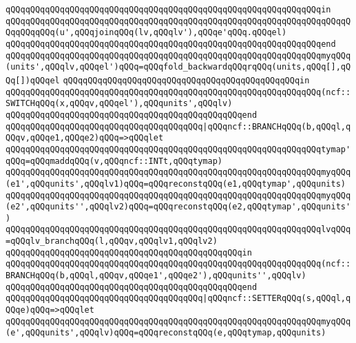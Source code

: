 \verb|qQQqqQQqqQQqqQQqqQQqqQQqqQQqqQQqqQQqqQQqqQQqqQQqqQQqqQQqqQQqqQQqin|\newline
\verb|qQQqqQQqqQQqqQQqqQQqqQQqqQQqqQQqqQQqqQQqqQQqqQQqqQQqqQQqqQQqqQQqqQQqqQQqqQQqqQQq(u',qQQqjoinqQQq(lv,qQQqlv'),qQQqe'qQQq.qQQqel)|\newline
\verb|qQQqqQQqqQQqqQQqqQQqqQQqqQQqqQQqqQQqqQQqqQQqqQQqqQQqqQQqqQQqqQQqend|\newline
\verb|qQQqqQQqqQQqqQQqqQQqqQQqqQQqqQQqqQQqqQQqqQQqqQQqqQQqqQQqqQQqqQQqmyqQQq(units',qQQqlv,qQQqel')qQQq=qQQqfold_backwardqQQqrqQQq(units,qQQq[],qQQq[])qQQqel|\newline
\verb|qQQqqQQqqQQqqQQqqQQqqQQqqQQqqQQqqQQqqQQqqQQqqQQqin|\newline
\verb|qQQqqQQqqQQqqQQqqQQqqQQqqQQqqQQqqQQqqQQqqQQqqQQqqQQqqQQqqQQqqQQq(ncf::SWITCHqQQq(x,qQQqv,qQQqel'),qQQqunits',qQQqlv)|\newline
\verb|qQQqqQQqqQQqqQQqqQQqqQQqqQQqqQQqqQQqqQQqqQQqqQQqend|\newline
\verb|qQQqqQQqqQQqqQQqqQQqqQQqqQQqqQQqqQQqqQQq|\verb#|qQQqncf::BRANCHqQQq(b,qQQql,qQQqv,qQQqe1,qQQqe2)qQQq=>qQQqlet#\newline
\verb|qQQqqQQqqQQqqQQqqQQqqQQqqQQqqQQqqQQqqQQqqQQqqQQqqQQqqQQqqQQqqQQqtymap'qQQq=qQQqmaddqQQq(v,qQQqncf::INTt,qQQqtymap)|\newline
\verb|qQQqqQQqqQQqqQQqqQQqqQQqqQQqqQQqqQQqqQQqqQQqqQQqqQQqqQQqqQQqqQQqmyqQQq(e1',qQQqunits',qQQqlv1)qQQq=qQQqreconstqQQq(e1,qQQqtymap',qQQqunits)|\newline
\verb|qQQqqQQqqQQqqQQqqQQqqQQqqQQqqQQqqQQqqQQqqQQqqQQqqQQqqQQqqQQqqQQqmyqQQq(e2',qQQqunits'',qQQqlv2)qQQq=qQQqreconstqQQq(e2,qQQqtymap',qQQqunits')|\newline
\verb|qQQqqQQqqQQqqQQqqQQqqQQqqQQqqQQqqQQqqQQqqQQqqQQqqQQqqQQqqQQqqQQqlvqQQq=qQQqlv_branchqQQq(l,qQQqv,qQQqlv1,qQQqlv2)|\newline
\verb|qQQqqQQqqQQqqQQqqQQqqQQqqQQqqQQqqQQqqQQqqQQqqQQqin|\newline
\verb|qQQqqQQqqQQqqQQqqQQqqQQqqQQqqQQqqQQqqQQqqQQqqQQqqQQqqQQqqQQqqQQq(ncf::BRANCHqQQq(b,qQQql,qQQqv,qQQqe1',qQQqe2'),qQQqunits'',qQQqlv)|\newline
\verb|qQQqqQQqqQQqqQQqqQQqqQQqqQQqqQQqqQQqqQQqqQQqqQQqend|\newline
\verb|qQQqqQQqqQQqqQQqqQQqqQQqqQQqqQQqqQQqqQQq|\verb#|qQQqncf::SETTERqQQq(s,qQQql,qQQqe)qQQq=>qQQqlet#\newline
\verb|qQQqqQQqqQQqqQQqqQQqqQQqqQQqqQQqqQQqqQQqqQQqqQQqqQQqqQQqqQQqqQQqmyqQQq(e',qQQqunits',qQQqlv)qQQq=qQQqreconstqQQq(e,qQQqtymap,qQQqunits)|\newline
